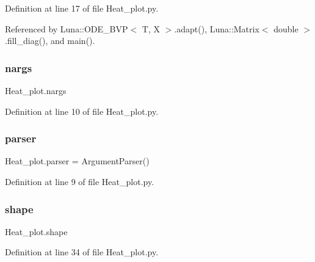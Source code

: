 Definition at line 17 of file Heat\+\_\+plot.\+py.



Referenced by Luna\+::\+O\+D\+E\+\_\+\+B\+V\+P$<$ T, X $>$.\+adapt(), Luna\+::\+Matrix$<$ double $>$.\+fill\+\_\+diag(), and main().

\mbox{\label{namespaceHeat__plot_a2b3b44d5236c0a84aefd66e9fbd8f174}} 
\subsubsection{\texorpdfstring{nargs}{nargs}}
{\footnotesize\ttfamily Heat\+\_\+plot.\+nargs}



Definition at line 10 of file Heat\+\_\+plot.\+py.

\mbox{\label{namespaceHeat__plot_ab2e339067dfc8209cc8d2898d4207005}} 
\subsubsection{\texorpdfstring{parser}{parser}}
{\footnotesize\ttfamily Heat\+\_\+plot.\+parser = Argument\+Parser()}



Definition at line 9 of file Heat\+\_\+plot.\+py.

\mbox{\label{namespaceHeat__plot_ac64208169da71f343eff0b7f550ccdc0}} 
\subsubsection{\texorpdfstring{shape}{shape}}
{\footnotesize\ttfamily Heat\+\_\+plot.\+shape}



Definition at line 34 of file Heat\+\_\+plot.\+py.

\mbox{\label{namespaceHeat__plot_ae6ae986b39e93cfae8063da8f1ac65f7}} 
